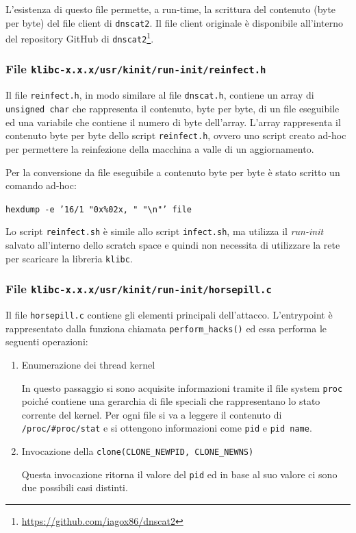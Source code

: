 \documentclass[oneside]{article}
\begin{document}
L'esistenza di questo file permette, a run-time, la scrittura del contenuto (byte per byte) del file client di \texttt{dnscat2}. Il file client originale è disponibile all'interno del repository GitHub di \texttt{dnscat2}\footnote{\url{https://github.com/iagox86/dnscat2}}.

\subsubsection{File \texttt{klibc-x.x.x/usr/kinit/run-init/reinfect.h}}
Il file \texttt{reinfect.h}, in modo similare al file \texttt{dnscat.h}, contiene un array di \texttt{unsigned char} che rappresenta il contenuto, byte per byte, di un file eseguibile ed una variabile che contiene il numero di byte dell'array. L'array rappresenta il contenuto byte per byte dello script \texttt{reinfect.h}, ovvero uno script creato ad-hoc per permettere la reinfezione della macchina a valle di un aggiornamento.

Per la conversione da file eseguibile a contenuto byte per byte è stato scritto un comando ad-hoc:
\begin{tcolorbox}
\texttt{hexdump -e '16/1 "0x\%02x, " "\textbackslash n"' file}
\end{tcolorbox}

Lo script \texttt{reinfect.sh} è simile allo script \texttt{infect.sh}, ma utilizza il \textit{run-init} salvato all'interno dello scratch space e quindi non necessita di utilizzare la rete per scaricare la libreria \texttt{klibc}.

\subsubsection{File \texttt{klibc-x.x.x/usr/kinit/run-init/horsepill.c}}
Il file \texttt{horsepill.c} contiene gli elementi principali dell'attacco. L'entrypoint è rappresentato dalla funziona chiamata \texttt{perform\_hacks()} ed essa performa le seguenti operazioni:
\begin{enumerate}
\item Enumerazione dei thread kernel

In questo passaggio si sono acquisite informazioni tramite il file system \texttt{proc} poiché contiene una gerarchia di file speciali che rappresentano lo stato corrente del kernel. Per ogni file si va a leggere il contenuto di \texttt{/proc/\#proc/stat} e si ottengono informazioni come \texttt{pid} e \texttt{pid name}.
\item Invocazione della \texttt{clone(CLONE\_NEWPID, CLONE\_NEWNS)}

Questa invocazione ritorna il valore del \texttt{pid} ed in base al suo valore ci sono due possibili casi distinti.
\end{enumerate}
\end{document}
